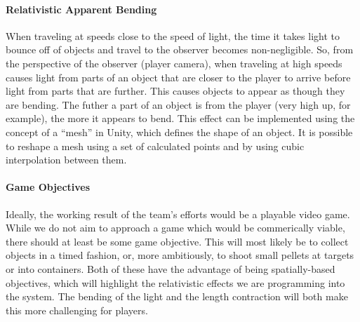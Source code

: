 \documentclass[12pt]{article}
\begin{document}
\paragraph{Relativistic Apparent Bending}
When traveling at speeds close to the speed of light, the time it takes light to bounce off of objects and travel to the observer becomes non-negligible. So, from the perspective of the observer (player camera), when traveling at high speeds causes light from parts of an object that are closer to the player to arrive before light from parts that are further. This causes objects to appear as though they are bending. The futher a part of an object is from the player (very high up, for example), the more it appears to bend. This effect can be implemented using the concept of a \enquote{mesh} in Unity, which defines the shape of an object. It is possible to reshape a mesh using a set of calculated points and by using cubic interpolation between them.

\paragraph{Game Objectives}
Ideally, the working result of the team's efforts would be a playable video game. While we do not aim to approach a game which would be commerically viable, there should at least be some game objective. This will most likely be to collect objects in a timed fashion, or, more ambitiously, to shoot small pellets at targets or into containers. Both of these have the advantage of being spatially-based objectives, which will highlight the relativistic effects we are programming into the system. The bending of the light and the length contraction will both make this more challenging for players.





























 
\end{document}
